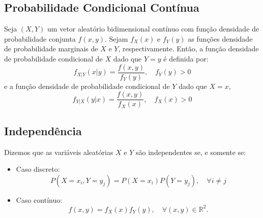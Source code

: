 \documentclass{article}
\begin{document}
\subsection{Probabilidade Condicional Contínua}
Seja $(X, Y)$ um vetor aleatório bidimensional contínuo com função densidade de probabilidade conjunta $f(x, y)$. 
Sejam $f_X(x)$ e $f_Y(y)$ as funções densidade de probabilidade marginais de $X$ e $Y$, respectivamente. 
Então, a função densidade de probabilidade condicional de $X$ dado que $Y = y$ é definida por:
    $$
    f_{X|Y}(x|y) = \frac{f(x, y)}{f_Y(y)}, \quad f_Y(y) > 0
    $$
e a função densidade de probabilidade condicional de $Y$ dado que $X = x$,
    $$
    f_{Y|X}(y|x) = \frac{f(x, y)}{f_X(x)}, \quad f_X(x) > 0
    $$

\subsection{Independência}
Dizemos que as variáveis aleatórias $X$ e $Y$ são independentes se, e somente se:

\begin{itemize}
    \item Caso discreto:
    $$
    P(X = x_i, Y = y_j) = P(X = x_i) P(Y = y_j), \quad \forall i \neq j
    $$
    \item Caso contínuo:
    $$
    f(x, y) = f_X(x) f_Y(y), \quad \forall (x, y) \in \mathbb{R}^2.
    $$
\end{itemize}
\end{document}
